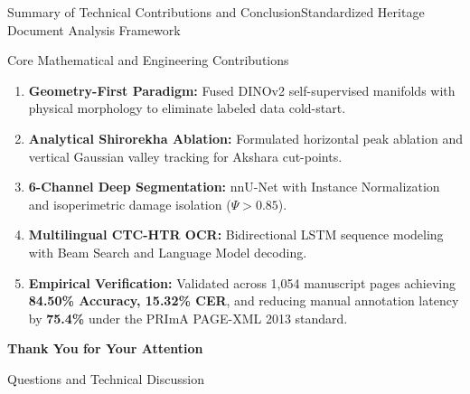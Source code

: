 \documentclass[
  aspectratio=169,
]{beamer}
\begin{document}
\begin{frame}{Summary of Technical Contributions and Conclusion}{Standardized Heritage Document Analysis Framework}
\begin{block}{Core Mathematical and Engineering Contributions}
\begin{enumerate}
  \item \textbf{Geometry-First Paradigm:} Fused DINOv2 self-supervised manifolds with physical morphology to eliminate labeled data cold-start.
  \item \textbf{Analytical Shirorekha Ablation:} Formulated horizontal peak ablation and vertical Gaussian valley tracking for Akshara cut-points.
  \item \textbf{6-Channel Deep Segmentation:} nnU-Net with Instance Normalization and isoperimetric damage isolation ($\Psi > 0.85$).
  \item \textbf{Multilingual CTC-HTR OCR:} Bidirectional LSTM sequence modeling with Beam Search and Language Model decoding.
  \item \textbf{Empirical Verification:} Validated across 1,054 manuscript pages achieving \textbf{84.50\% Accuracy, 15.32\% CER}, and reducing manual annotation latency by \textbf{75.4\%} under the PRImA PAGE-XML 2013 standard.
\end{enumerate}
\end{block}
\end{frame}

\begin{frame}[plain]
\vfill
\centerline{\Large\textbf{Thank You for Your Attention}}
\vspace{0.5cm}
\centerline{\normalsize Questions and Technical Discussion}
\vfill
\end{frame}
\end{document}

